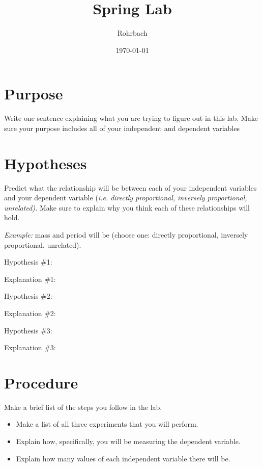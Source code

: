 \documentclass[10pt]{exam}
\title{Spring Lab}
\author{Rohrbach}
\date{\today}
\begin{document}
\maketitle


\section*{Purpose} 
  Write one sentence explaining what you are trying to figure out in this lab. Make sure your purpose includes all of your independent and dependent variables

  \vs

\section*{Hypotheses} 
  Predict what the relationship will be between each of your independent variables and your dependent variable (\emph{i.e. directly proportional, inversely proportional, unrelated).} Make sure to explain why you think each of these relationships will hold.

  \emph{Example:} mass and period will be (choose one: directly proportional, inversely proportional, unrelated).
  \vspace{1em}

  Hypothesis \#1:\vspace{1em}

  Explanation \#1: \vspace{3em}

  Hypothesis \#2:\vspace{1em}

  Explanation \#2: \vspace{3em}

  Hypothesis \#3:\vspace{1em}

  Explanation \#3: \vspace{3em}



\section*{Procedure} 
  Make a brief list of the steps you follow in the lab.

  \begin{itemize}
    \item
      Make a list of all three experiments that you will perform.
    \item
      Explain how, specifically, you will be measuring the dependent variable.
    \item
      Explain how many values of each independent variable there will be.

  \end{itemize}
\end{document}
